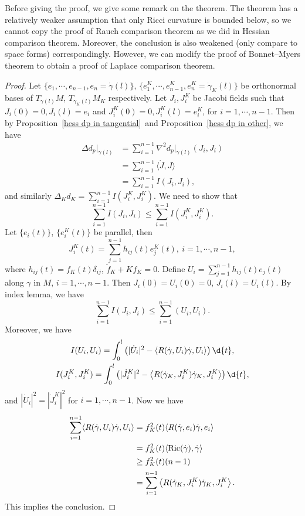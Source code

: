 \begin{rem}
    Before giving the proof, we give some remark on the theorem.
    The theorem has a relatively weaker assumption that only Ricci curvature is bounded below, so we cannot copy the proof of Rauch comparison theorem as we did in Hessian comparison theorem.
    Moreover, the conclusion is also weakened (only compare to space forms) correspondingly.
    However, we can modify the proof of Bonnet--Myers theorem to obtain a proof of Laplace comparison theorem.
\end{rem}
\begin{proof}
    Let $\{e_1,\cdots,e_{n-1},e_n=\dot{\gamma}(l)\}$, $\{e_1^K,\cdots,e_{n-1}^K,e_n^K=\dot{\gamma}_K(l)\}$ be orthonormal bases of $T_{\gamma(l)}M$, $T_{\gamma_K(l)}M_K$ respectively.
    Let $J_i,J_i^K$ be Jacobi fields such that $J_i(0)=0,J_i(l)=e_i$ and $J_i^K(0)=0,J_i^K(l)=e_i^K$, for $i=1,\cdots,n-1$.
    Then by Proposition~\ref{hess dp in tangential}~and Proposition~\ref{hess dp in other}, we have
    \begin{align*}
        \Delta d_p|_{\gamma(l)}&=\sum_{i=1}^{n-1}\nabla^2d_p|_{\gamma(l)}(J_i,J_i)\\
        &=\sum_{i=1}^{n-1}\langle\dot{J},J\rangle\\
        &=\sum_{i=1}^{n-1}I(J_i,J_i),
    \end{align*}
    and similarly $\Delta_Kd_K=\sum_{i=1}^{n-1}I(J_i^K,J_i^K)$.
    We need to show that 
    \[\sum_{i=1}^{n-1}I(J_i,J_i)\leq\sum_{i=1}^{n-1}I(J_i^K,J_i^K).\]
    Let $\{e_i(t)\}$, $\{e_i^K(t)\}$ be parallel, then
    \[J^K_i(t)=\sum_{j=1}^{n-1}h_{ij}(t)e_j^K(t),\ i=1,\cdots,n-1,\]
    where $h_{ij}(t)=f_K(t)\delta_{ij}$, $\ddot{f}_K+Kf_K=0$.
    Define $U_i=\sum_{j=1}^{n-1}h_{ij}(t)e_j(t)$ along $\gamma$ in $M$, $i=1,\cdots,n-1$.
    Then $J_i(0)=U_i(0)=0$, $J_i(l)=U_i(l)$.
    By index lemma, we have
    \[\sum_{i=1}^{n-1}I(J_i,J_i)\leq\sum_{i=1}^{n-1}(U_i,U_i).\]
    Moreover, we have
    \begin{gather*}
        I(U_i,U_i)=\int_0^l\left(|\dot{U}_i|^2-\langle R(\dot{\gamma},U_i)\dot{\gamma},U_i\rangle\right)\d{t},\\
        I(J_i^K,J_i^K)=\int_0^l\left(|\dot{J}_i^K|^2-\left\langle R(\dot{\gamma}_K,J_i^K)\dot{\gamma}_K,J_i^K\right\rangle\right)\d{t},
    \end{gather*}
    and $|\dot{U}_i|^2=|\dot{J}_i^K|^2$ for $i=1,\cdots,n-1$.
    Now we have
    \begin{align*}
        \sum_{i=1}^{n-1}\langle R(\dot{\gamma},U_i)\dot{\gamma},U_i\rangle&=f_K^2(t)\langle R(\dot{\gamma},e_i)\dot{\gamma},e_i\rangle\\
        &=f^2_K(t)\langle\operatorname{Ric}(\dot{\gamma}),\dot{\gamma}\rangle\\
        &\geq f^2_K(t)(n-1)\\
        &=\sum_{i=1}^{n-1}\left\langle R(\dot{\gamma}_K,J_i^K)\dot{\gamma}_K,J_i^K\right\rangle.
    \end{align*}
    This implies the conclusion.
\end{proof}

